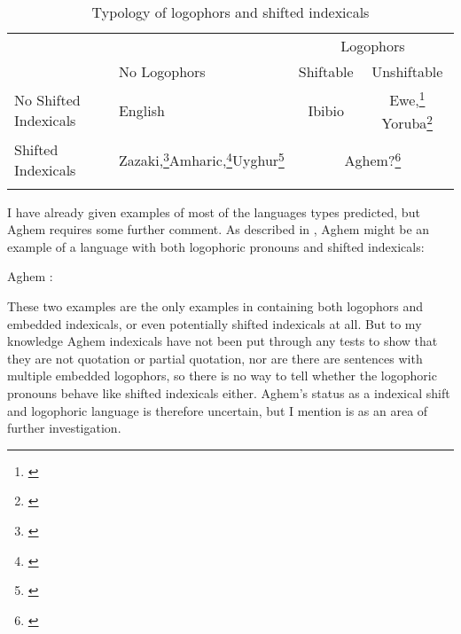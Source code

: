 \documentclass[output=paper]{langscibook}
\begin{document}
\begin{table}
\begin{tabularx}{\textwidth}{l>{\centering}Xcc}
          \lsptoprule
	&	&	\multicolumn{2}{c}{{Logophors}} \\\cmidrule(lr){3-4}
	&	{No Logophors}	&	{Shiftable}	&	{Unshiftable} \\ \midrule
{No Shifted Indexicals} &	English	&	Ibibio	&	Ewe,\footnote{\citet{Clements1975,Pearson2015}} Yoruba\footnote{\citet{Adesola2005}} \\
	{Shifted Indexicals}	& Zazaki,\footnote{\citet{Anand2004,Anand2006}}\newline Amharic,\footnote{\citet{Schlenker2003}}\newline Uyghur\footnote{\citet{Sudo2012,Shklovsky2014}}	&	\multicolumn{2}{c}{Aghem?\footnote{\citet{Hyman1979}}} \\
	\lspbottomrule
\end{tabularx}
\caption{Typology of logophors and shifted indexicals}\label{type}
\end{table}

I have already given examples of most of the languages types predicted, but Aghem requires some further comment. As described in \citet{Hyman1979}, Aghem might be an example of a language with both logophoric pronouns and shifted indexicals:
\begin{exe}
\ex\label{aghem} Aghem \citep[14]{Hyman1979}:
\begin{xlist}%
	
\end{xlist}
\end{exe}
These two examples are the only examples in \citet{Hyman1979} containing both logophors and embedded indexicals, or even potentially shifted indexicals at all. But to my knowledge Aghem indexicals have not been put through any tests to show that they are not quotation or partial quotation, nor are there are sentences with multiple embedded logophors, so there is no way to tell whether the logophoric pronouns behave like shifted indexicals either. Aghem's status as a indexical shift and logophoric language is therefore uncertain, but I mention is as an area of further investigation.
\end{document}
